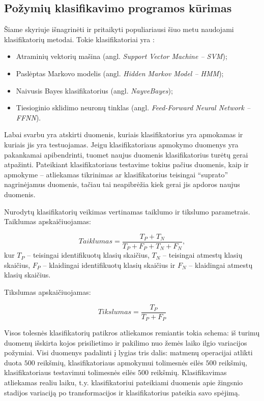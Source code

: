\documentclass[]{vgtuef}
\begin{document}
\subsection{Požymių klasifikavimo programos kūrimas}

Šiame skyriuje išnagrinėti ir pritaikyti populiariausi šiuo metu naudojami klasifikatorių metodai. Tokie klasifikatoriai yra \cite{824819}:

\begin{itemize}
\item Atraminių vektorių mašina (angl. \textit{Support Vector Machine -- SVM});
\item Paslėptas Markovo modelis (angl. \textit{Hidden Markov Model -- HMM});
\item Naivusis Bayes klasifikatorius (angl. \textit{NayveBayes});
\item Tiesioginio sklidimo neuronų tinklas (angl. \textit{Feed-Forward Neural Network -- FFNN}).
\end{itemize}

Labai svarbu yra atskirti duomenis, kuriais klasifikatorius yra apmokamas ir kuriais jis yra testuojamas. Jeigu klasifikatoriaus apmokymo duomenys yra pakankamai apibendrinti, tuomet naujus duomenis klasifikatorius turėtų gerai atpažinti. Pateikiant klasifikatoriaus testavime tokius pačius duomenis, kaip ir apmokyme -- atliekamas tikrinimas ar klasifikatorius teisingai ``suprato'' nagrinėjamus duomenis, tačiau tai neapibrėžia kiek gerai jis apdoros naujus duomenis.

Nurodytų klasifikatorių veikimas vertinamas taiklumo ir tikslumo parametrais. Taiklumas apskaičiuojamas:

\begin{equation}
Taiklumas = \frac{T_P + T_N}{T_P + F_P + T_N + F_N},
\end{equation}
kur $T_P$ -- teisingai identifikuotų klasių skaičius, $T_N$ -- teisingai atmestų klasių skaičius, $F_P$ -- klaidingai identifikuotų klasių skaičius ir $F_N$ -- klaidingai atmestų klasių skaičius.

Tikslumas apskaičiuojamas:

\begin{equation}
Tikslumas = \frac{T_P}{T_P + F_P}
\end{equation}

Visos tolesnės klasifikatorių patikros atliekamos remiantis tokia schema: iš turimų duomenų išskirta kojos prisilietimo ir pakilimo nuo žemės laiko ilgio variacijos požymiai. Visi duomenys padalinti į lygias tris dalis: matmenų operacijai atlikti duota $500$ reikšmių, klasifikatoriaus apmokymui tolimesnės eilės $500$ reikšmių, klasifikatoriaus testavimui tolimesnės eilės $500$ reikšmių. Klasifikavimas atliekamas realiu laiku, t.y. klasifikatoriui pateikiami duomenis apie žingsnio stadijos variaciją po transformacijos ir klasifikatorius pateikia savo spėjimą.
\end{document}
